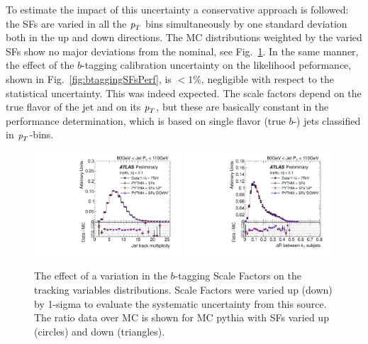 To estimate the impact of this uncertainty a conservative approach is followed: the SFs are varied in all the ${\emph{p}_{T}}$ bins simultaneously by one standard deviation both in the up and down directions. The MC distributions weighted by the varied SFs show no major deviations from the nominal, see Fig.~\ref{fig:btaggingSFs}.  %
In the same manner, the effect of the $b$-tagging calibration uncertainty on the likelihood peformance, shown in Fig.~\ref{fig:btaggingSFsPerf}, is $< 1$\%, negligible with respect to the statistical uncertainty.
This was indeed expected. The scale factors depend on the true flavor of the jet and on its ${\emph{p}_{T}}$, but these are basically constant in the performance determination, which is based on single flavor (true $b$-) jets classified in ${\emph{p}_{T}}$-bins.


\begin{figure}[tp]
\centering
\includegraphics[width=0.49\textwidth]{FIGS/systematics/BTagCalib_DataVarNtrkPT080.pdf}
\includegraphics[width=0.49\textwidth]{FIGS/systematics/BTagCalib_DataVarDRktaxisPT080.pdf}
\caption{The effect of a variation in the $b$-tagging Scale Factors on the tracking variables distributions. Scale Factors were varied up (down) by 1-sigma to evaluate the systematic uncertainty from this source. The ratio data over MC is shown for MC {\sc pythia} with SFs varied up (circles) and down (triangles).}
\label{fig:btaggingSFs}
\end{figure}

